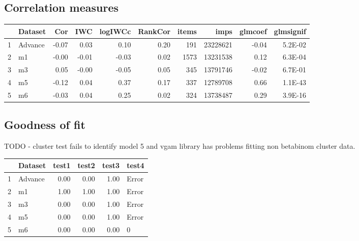 \documentclass[11pt,a4,singlespacing,titlepagenumber=on]{scrreprt}
\numberwithin{equation}{chapter} %
\theoremstyle{remark}
\begin{document}
\subsection{Correlation measures}


\begin{table}[ht]
\centering
\begin{tabular}{rlrrrrrrrr}
  \hline
 & Dataset & Cor & IWC & logIWCc & RankCor & items & imps & glmcoef & glmsignif \\ 
  \hline
  1 & Advance & -0.07 & 0.03 & 0.10 & 0.20 & 191 & 23228621 & -0.04 & 5.2E-02 \\ 
  2 & m1 & -0.00 & -0.01 & -0.03 & 0.02 & 1573 & 13231538 & 0.12 & 6.3E-04 \\ 
  3 & m3 & 0.05 & -0.00 & -0.05 & 0.05 & 345 & 13791746 & -0.02 & 6.7E-01 \\ 
  4 & m5 & -0.12 & 0.04 & 0.37 & 0.17 & 337 & 12789708 & 0.66 & 1.1E-43 \\ 
  5 & m6 & -0.03 & 0.04 & 0.25 & 0.02 & 324 & 13738487 & 0.29 & 3.9E-16 \\ 
   \hline
\end{tabular}
\end{table}


\subsection{Goodness of fit}

TODO - cluster test fails to identify model 5 and vgam library has problems fitting non betabinom cluster data.
\begin{table}[ht]
\centering
\begin{tabular}{rlrrrl}
  \hline
 & Dataset & test1 & test2 & test3 & test4 \\ 
  \hline
  1 & Advance & 0.00 & 0.00 & 1.00 & Error \\ 
  2 & m1 & 1.00 & 1.00 & 1.00 & Error \\ 
  3 & m3 & 0.00 & 0.00 & 1.00 & Error \\ 
  4 & m5 & 0.00 & 0.00 & 1.00 & Error \\ 
  5 & m6 & 0.00 & 0.00 & 0.00 & 0 \\ 
   \hline
\end{tabular}
\end{table}
\end{document}
